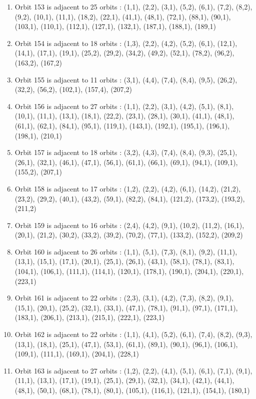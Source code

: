 \documentclass[12pt]{article}
\begin{document}
\begin{enumerate}
\item Orbit 153 is adjacent to 25 orbits : (1,1), (2,2), (3,1), (5,2), (6,1), (7,2), (8,2), (9,2), (10,1), (11,1), (18,2), (22,1), (41,1), (48,1), (72,1), (88,1), (90,1), (103,1), (110,1), (112,1), (127,1), (132,1), (187,1), (188,1), (189,1)
\item Orbit 154 is adjacent to 18 orbits : (1,3), (2,2), (4,2), (5,2), (6,1), (12,1), (14,1), (17,1), (19,1), (25,2), (29,2), (34,2), (49,2), (52,1), (78,2), (96,2), (163,2), (167,2)
\item Orbit 155 is adjacent to 11 orbits : (3,1), (4,4), (7,4), (8,4), (9,5), (26,2), (32,2), (56,2), (102,1), (157,4), (207,2)
\item Orbit 156 is adjacent to 27 orbits : (1,1), (2,2), (3,1), (4,2), (5,1), (8,1), (10,1), (11,1), (13,1), (18,1), (22,2), (23,1), (28,1), (30,1), (41,1), (48,1), (61,1), (62,1), (84,1), (95,1), (119,1), (143,1), (192,1), (195,1), (196,1), (198,1), (210,1)
\item Orbit 157 is adjacent to 18 orbits : (3,2), (4,3), (7,4), (8,4), (9,3), (25,1), (26,1), (32,1), (46,1), (47,1), (56,1), (61,1), (66,1), (69,1), (94,1), (109,1), (155,2), (207,1)
\item Orbit 158 is adjacent to 17 orbits : (1,2), (2,2), (4,2), (6,1), (14,2), (21,2), (23,2), (29,2), (40,1), (43,2), (59,1), (82,2), (84,1), (121,2), (173,2), (193,2), (211,2)
\item Orbit 159 is adjacent to 16 orbits : (2,4), (4,2), (9,1), (10,2), (11,2), (16,1), (20,1), (21,2), (30,2), (33,2), (39,2), (70,2), (77,1), (133,2), (152,2), (209,2)
\item Orbit 160 is adjacent to 26 orbits : (1,1), (5,1), (7,3), (8,1), (9,2), (11,1), (13,1), (15,1), (17,1), (20,1), (25,1), (26,1), (43,1), (58,1), (78,1), (83,1), (104,1), (106,1), (111,1), (114,1), (120,1), (178,1), (190,1), (204,1), (220,1), (223,1)
\item Orbit 161 is adjacent to 22 orbits : (2,3), (3,1), (4,2), (7,3), (8,2), (9,1), (15,1), (20,1), (25,2), (32,1), (33,1), (47,1), (78,1), (91,1), (97,1), (171,1), (183,1), (206,1), (213,1), (215,1), (222,1), (223,1)
\item Orbit 162 is adjacent to 22 orbits : (1,1), (4,1), (5,2), (6,1), (7,4), (8,2), (9,3), (13,1), (18,1), (25,1), (47,1), (53,1), (61,1), (89,1), (90,1), (96,1), (106,1), (109,1), (111,1), (169,1), (204,1), (228,1)
\item Orbit 163 is adjacent to 27 orbits : (1,2), (2,2), (4,1), (5,1), (6,1), (7,1), (9,1), (11,1), (13,1), (17,1), (19,1), (25,1), (29,1), (32,1), (34,1), (42,1), (44,1), (48,1), (50,1), (68,1), (78,1), (80,1), (105,1), (116,1), (121,1), (154,1), (180,1)

\end{enumerate}
\end{document}
